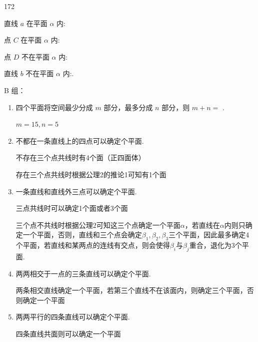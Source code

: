 \begin{enumerate}
\begin{dingautolist}{172}
        \item 直线 $a$ 在平面 $\alpha$ 内:
        
        \item 点 $C$ 在平面 $\alpha$ 内:

        \item 点 $D$ 不在平面 $\alpha$ 内:
        
        \item 直线 $b$ 不在平面 $\alpha$ 内:.
    \end{dingautolist}
\end{enumerate}

B 组：
\begin{enumerate}
    \item 四个平面将空间最少分成 $m$ 部分，最多分成 $n$ 部分，则 $m + n =$ .
    \begin{jieda}
        $m = 15, n = 5$
    \end{jieda}
    
    \item 不都在一条直线上的四点可以确定个平面.
    \begin{jieda}
        不存在三个点共线时有4个面（正四面体）

        存在三个点共线时根据公理2的推论1可知有1个面
    \end{jieda}

    \item 一条直线和直线外三点可以确定个平面.
    \begin{jieda}
        三点共线时可以确定1个面或者3个面

        三个点不共线时根据公理2可知这三个点确定一个平面$\alpha$，若直线在$\alpha$内则只确定一个平面，否则，直线和三个点会确定$\beta_1, \beta_2, \beta_3$三个平面，因此最多确定4个平面，若直线和某两点的连线有交点，则会使得$\beta_i$与$\beta_j$重合，退化为3个平面.
    \end{jieda}

    \item 两两相交于一点的三条直线可以确定个平面.
    \begin{jieda}
        两条相交直线确定一个平面，若第三个直线不在该面内，则确定三个平面，否则确定一个平面
    \end{jieda}

    \item 两两平行的四条直线可以确定个平面.
    \begin{jieda}
        四条直线共面则可以确定一个平面


\end{jieda}
\end{enumerate}

